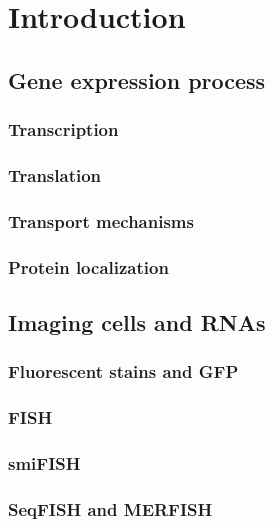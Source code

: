 
\graphicspath{{../../figures/introduction/}}


\chapter{Introduction} \label{chap:introduction}

\minitoc
\newpage


\section{Gene expression process}


\subsection{Transcription}

\subsection{Translation}

\subsection{Transport mechanisms}

\subsection{Protein localization}


\section{Imaging cells and \ac{RNA}s}


\subsection{Fluorescent stains and \ac{GFP}}

\subsection{\ac{FISH}}

\subsection{\ac{smiFISH}}

\subsection{\ac{SeqFISH} and \ac{MERFISH}}


